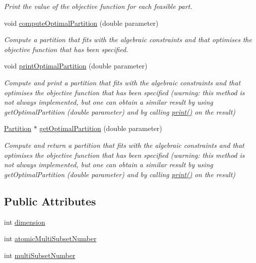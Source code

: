 \begin{DoxyCompactItemize}
\begin{DoxyCompactList}\small\item\em Print the value of the objective function for each feasible part. \end{DoxyCompactList}\item 
void \hyperlink{classMultiSet_ac6dd8ba2c14844029e5ac13d40519305}{compute\-Optimal\-Partition} (double parameter)
\begin{DoxyCompactList}\small\item\em Compute a partition that fits with the algebraic constraints and that optimises the objective function that has been specified. \end{DoxyCompactList}\item 
void \hyperlink{classMultiSet_a5f8567d28993d4e5c6c314cc5dbca188}{print\-Optimal\-Partition} (double parameter)
\begin{DoxyCompactList}\small\item\em Compute and print a partition that fits with the algebraic constraints and that optimises the objective function that has been specified (warning\-: this method is not always implemented, but one can obtain a similar result by using get\-Optimal\-Partition (double parameter) and by calling \hyperlink{classMultiSet_ab08f0a90d249cecc0f7931caa2632f48}{print()} on the result) \end{DoxyCompactList}\item 
\hyperlink{classPartition}{Partition} $\ast$ \hyperlink{classMultiSet_a338a036d443609e814b8c8ff414cce7e}{get\-Optimal\-Partition} (double parameter)
\begin{DoxyCompactList}\small\item\em Compute and return a partition that fits with the algebraic constraints and that optimises the objective function that has been specified (warning\-: this method is not always implemented, but one can obtain a similar result by using get\-Optimal\-Partition (double parameter) and by calling \hyperlink{classMultiSet_ab08f0a90d249cecc0f7931caa2632f48}{print()} on the result) \end{DoxyCompactList}\end{DoxyCompactItemize}
\subsection*{Public Attributes}
\begin{DoxyCompactItemize}
\item 
int \hyperlink{classMultiSet_a1a49a7a8c3d0db003198312c3bd541af}{dimension}
\item 
int \hyperlink{classMultiSet_a3084e5afaa18d1f19a38f7139f827cfc}{atomic\-Multi\-Subset\-Number}
\item 
int \hyperlink{classMultiSet_a9c0c781a33f40bb2cd28110805572b7a}{multi\-Subset\-Number}
\end{DoxyCompactItemize}
